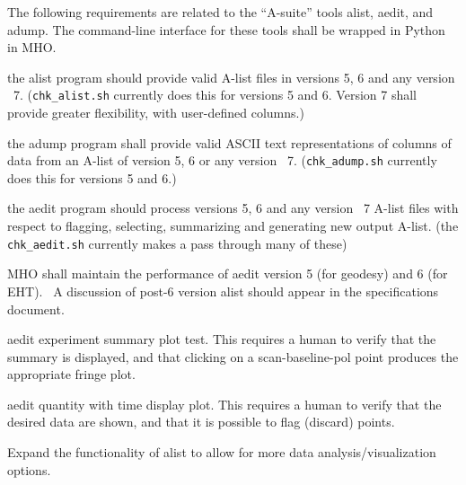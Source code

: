 The following requirements are related to the ``A-suite'' tools alist, aedit,
and adump.  The command-line interface for these tools shall be wrapped 
in Python in \acs{MHO}.

\begin{description}

 the \acs{alist} program should provide valid \acs{A-list}
    files in versions 5, 6 and any version \TBD~7.
    (\texttt{chk\_alist.sh} currently does this for versions 5 and 6. Version
    7 shall provide greater flexibility, with user-defined columns.)

 the \acs{adump} program shall provide valid ASCII text
    representations of columns of data from an \acs{A-list} of version
    5, 6 or any version \TBD~7.
    (\texttt{chk\_adump.sh} currently does this for versions 5 and 6.)

 the \acs{aedit} program should process versions 5, 6 and
    any version \TBD~7 \acs{A-list} files with respect to flagging,
    selecting, summarizing and generating new output \acs{A-list}.
    (the \texttt{chk\_aedit.sh} currently makes a pass through many
    of these)


                    
 \ac{MHO} shall maintain the performance of \acs{aedit} version
5 (for geodesy) and 6 (for EHT). \TBD~A discussion of post-6 
version alist should appear in the specifications document.

 \acs{aedit} experiment summary plot test.  This requires a
    human to verify that the summary is displayed, and that clicking
    on a scan-baseline-pol point produces the appropriate fringe plot.

 \acs{aedit} quantity with time display plot.  This requires
    a human to verify that the desired data are shown, and that it
    is possible to flag (discard) points.

 Expand the functionality of \acs{alist} to allow for more data
    analysis/visualization options.


\end{description}

